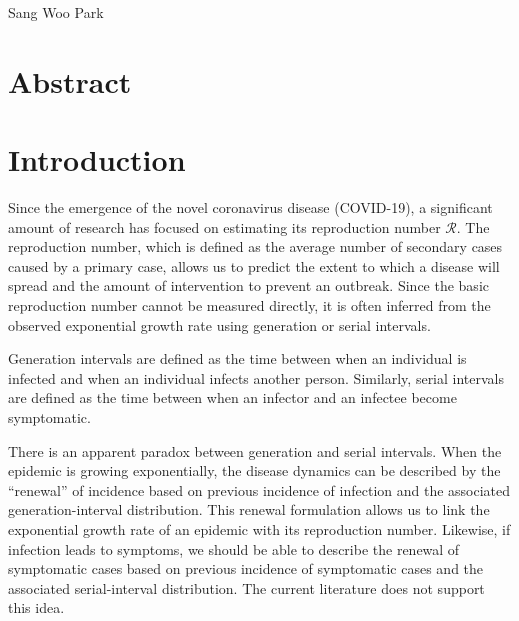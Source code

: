 \documentclass[12pt]{article}
\date{\today}
\begin{document}
\begin{flushleft}{
	\Large
	\textbf{}
}
Sang Woo Park
\end{flushleft}

\section*{Abstract}

\pagebreak


\section{Introduction}

Since the emergence of the novel coronavirus disease (COVID-19), a significant amount of research has focused on estimating its reproduction number $\mathcal R$.
The reproduction number, which is defined as the average number of secondary cases caused by a primary case, allows us to predict the extent to which a disease will spread and the amount of intervention to prevent an outbreak.
Since the basic reproduction number cannot be measured directly, it is often inferred from the observed exponential growth rate using generation or serial intervals.

Generation intervals are defined as the time between when an individual is infected and when an individual infects another person.
Similarly, serial intervals are defined as the time between when an infector and an infectee become symptomatic.

There is an apparent paradox between generation and serial intervals.
When the epidemic is growing exponentially, the disease dynamics can be described by the ``renewal'' of incidence based on previous incidence of infection and the associated generation-interval distribution.
This renewal formulation allows us to link the exponential growth rate of an epidemic with its reproduction number.
Likewise, if infection leads to symptoms, we should be able to describe the renewal of symptomatic cases based on previous incidence of symptomatic cases and the associated serial-interval distribution.
The current literature does not support this idea.
\end{document}
